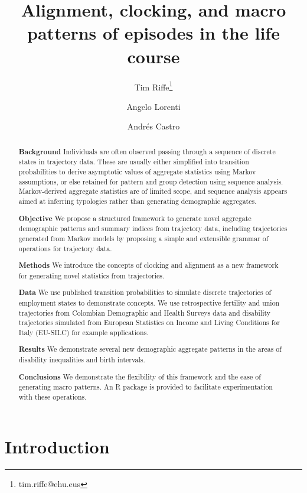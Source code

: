 \documentclass[a4paper,left=1.25cm,right=1.25cm,top=1.25cm,bottom=1.25cm]{article}
\newcommand{\absdiv}[1]{%
  \par\addvspace{.5\baselineskip}%
  \noindent\textbf{#1}\quad\ignorespaces
}
\begin{document}
\title{Alignment, clocking, and macro patterns of episodes in the life course}
\author[1,2,3]{Tim Riffe\thanks{tim.riffe@ehu.eus}}
\author[3]{Angelo Lorenti}
\author[3]{Andr\'{e}s Castro}
\maketitle

\begin{abstract}

\absdiv{Background}Individuals are often observed passing through a sequence of discrete states in trajectory data. These are usually either simplified into transition probabilities to derive asymptotic values of aggregate statistics using Markov assumptions, or else retained for pattern and group detection using sequence analysis. Markov-derived aggregate statistics are of limited scope, and sequence analysis appears aimed at inferring typologies rather than generating demographic aggregates.
\absdiv{Objective}We propose a structured framework to generate novel aggregate demographic patterns and summary indices from trajectory data, including trajectories generated from Markov models by proposing a simple and extensible grammar of operations for trajectory data.
\absdiv{Methods}We introduce the concepts of clocking and alignment as a new framework for generating novel statistics from trajectories. 
\absdiv{Data}We use published transition probabilities to simulate discrete trajectories of employment states to demonstrate concepts. We use retrospective fertility and union trajectories from Colombian Demographic and Health Surveys data and disability trajectories simulated from European Statistics on Income and Living Conditions for Italy (EU-SILC) for example applications.
\absdiv{Results}We demonstrate  several new demographic aggregate patterns in the areas of disability inequalities and birth intervals.
\absdiv{Conclusions}We demonstrate the flexibility of this framework and the ease of generating macro patterns. An R package is provided to facilitate experimentation with these operations.
\end{abstract}

\doublespacing
\section{Introduction}
\end{document}
